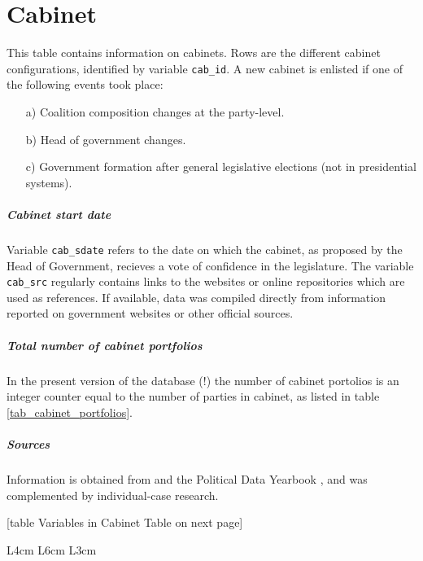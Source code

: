\section{Cabinet}\label{sec_cabinet}
This table contains information on cabinets.
Rows are the different cabinet configurations, identified by variable \texttt{\footnotesize cab\_id}. 
A new cabinet is enlisted if one of the following events took place:
\begin{itemize}\label{cabinet_change_criteria}\itemsep-4pt 
\item[a)] Coalition composition changes at the party-level.
\item[b)] Head of government changes.
\item[c)] Government formation after general legislative elections (not in presidential systems).
\end{itemize}

\subparagraph{Cabinet start date} Variable \texttt{\footnotesize cab\_sdate} refers to the date on which the cabinet, as proposed by the Head of Government, recieves a vote of confidence in the legislature. The variable \texttt{\footnotesize cab\_src} regularly contains links to the websites or online repositories which are used as references. If available, data was compiled directly from information reported on government websites or other official sources.

\subparagraph{Total number of cabinet portfolios} In the present version of the database (!) the number of cabinet portolios is an integer counter equal to the number of parties in cabinet, as listed in table \ref{tab_cabinet_portfolios}. 

\subparagraph{Sources} Information is obtained from \citet*{Woldendrop_et_al2000} and the Political Data Yearbook \citeyearpar{EJPR_PDY}, and was complemented by individual-case research.


\begin{center}
[table Variables in Cabinet Table on next page]
\end{center}

\newpage
\begin{center}
\begin{longtable}{L{4cm} L{6cm} L{3cm}}
\caption{Variables in Cabinet Table\label{tab_cabinet}}


\end{longtable}
\end{center}

